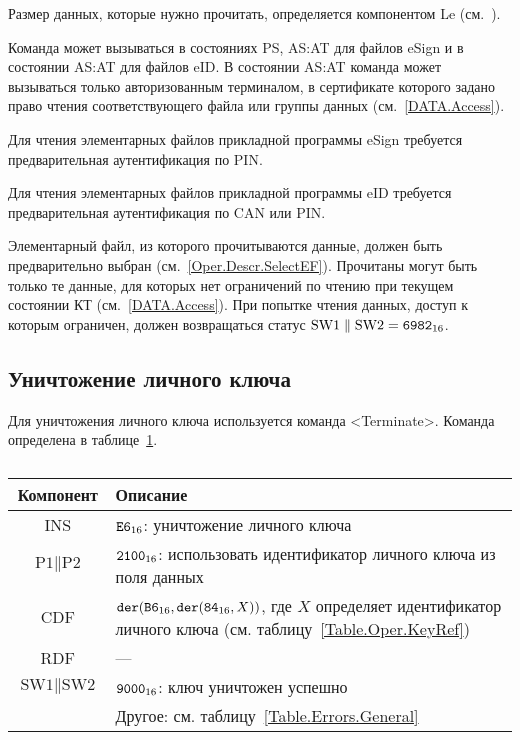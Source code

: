 Размер данных, которые нужно прочитать, определяется компонентом 
Le (см.~\cite{APDU}).

Команда может вызываться в состояниях PS, AS:AT 
для файлов eSign и в состоянии AS:AT для файлов eID.
В состоянии AS:AT команда может вызываться только 
авторизованным терминалом, в сертификате которого
задано право чтения соответствующего файла или группы данных
(см.~\ref{DATA.Access}).

Для чтения элементарных файлов прикладной программы eSign 
требуется предварительная аутентификация по PIN.

Для чтения элементарных файлов прикладной программы eID 
требуется предварительная аутентификация по CAN или PIN.

Элементарный файл, из которого прочитываются данные, должен быть предварительно 
выбран (см.~\ref{Oper.Descr.SelectEF}). Прочитаны могут быть только те данные, 
для которых нет ограничений по чтению при текущем состоянии КТ 
(см.~\ref{DATA.Access}). При попытке чтения данных, доступ к которым ограничен, 
должен возвращаться статус $\text{SW1} \parallel \text{SW2} = \texttt{6982}_{16}$.

\subsection{Уничтожение личного ключа}
\label{Oper.Descr.Terminate}

Для уничтожения личного ключа используется команда <Terminate>.
Команда определена в таблице~\ref{Table.Oper.TerminateCmd}.

\begin{table}[ht]
\caption{}\label{Table.Oper.TerminateCmd}
\begin{tabular}{|c|p{14cm}|}
\hline
Компонент & Описание\\
\hline
\hline
INS & $\texttt{E6}_{16}$: уничтожение личного ключа\\
\hline
$\text{P1} \parallel\text{P2}$ & $\texttt{2100}_{16}$:
использовать идентификатор личного ключа из поля данных\\
\hline
CDF &  $\texttt{der}(\texttt{B6}_{16},\texttt{der}(\texttt{84}_{16}, X))$,
где $X$ определяет идентификатор личного ключа
(см. таблицу~\ref{Table.Oper.KeyRef})\\ 
\hline 
\hline
RDF & ---  \\
\hline
$\text{SW1} \parallel \text{SW2}$ & 
$\texttt{9000}_{16}$: ключ уничтожен успешно\\
\cline{2-2}
 & Другое: см. таблицу~\ref{Table.Errors.General} \\
\hline
\end{tabular}
\end{table}

